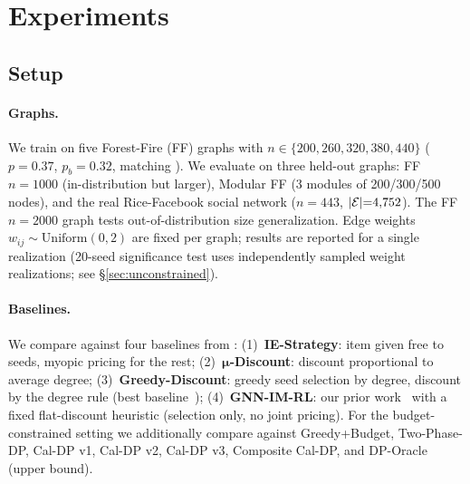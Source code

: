 %

\section{Experiments}
\label{sec:experiments}

\subsection{Setup}
\label{sec:setup}

\paragraph{Graphs.}
We train on five Forest-Fire (FF) graphs with $n \in \{200, 260, 320, 380, 440\}$
($p{=}0.37$, $p_b{=}0.32$, matching \citet{babaei2013revenue}).
We evaluate on three held-out graphs: FF $n{=}1000$ (in-distribution but larger),
Modular FF (3 modules of 200/300/500 nodes), and the real
Rice-Facebook social network ($n{=}443$, $|\mathcal{E}|{=}4{,}752$).
The FF $n{=}2000$ graph tests out-of-distribution size generalization.
Edge weights $w_{ij} \sim \mathrm{Uniform}(0, 2)$ are fixed per graph;
results are reported for a single realization (20-seed significance test uses
independently sampled weight realizations; see §\ref{sec:unconstrained}).

\paragraph{Baselines.}
We compare against four baselines from \citet{babaei2013revenue}:
(1)~\textbf{IE-Strategy}: item given free to seeds, myopic pricing for the rest;
(2)~$\bm{\mu}$\textbf{-Discount}: discount proportional to average degree;
(3)~\textbf{Greedy-Discount}: greedy seed selection by degree, discount by the
degree rule (best baseline~\citep{babaei2013revenue});
(4)~\textbf{GNN-IM-RL}: our prior work~\citep{anon_wsdm27} with a fixed
flat-discount heuristic (selection only, no joint pricing).
For the budget-constrained setting we additionally compare against
Greedy+Budget, Two-Phase-DP, Cal-DP v1, Cal-DP v2, Cal-DP v3,
Composite Cal-DP, and DP-Oracle (upper bound).


